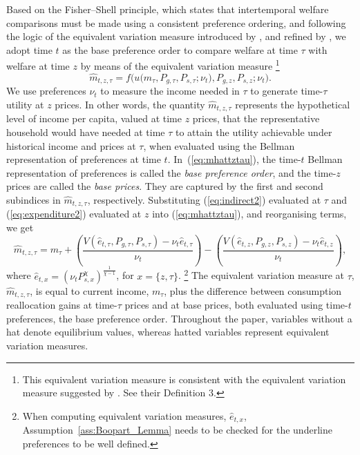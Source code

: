 \documentclass[12pt,a4paper]{article}
\begin{document}
Based on the Fisher–Shell principle, which states that intertemporal welfare comparisons must be made using a consistent preference ordering, and following the logic of the equivalent variation measure introduced by \cite{Licandro_RuizCastillo_Duran}, and refined by \cite{duran_licandro_2024}, we adopt time $t$ as the base preference order to compare welfare at time $\tau$ with welfare at time $z$ by means of the equivalent variation measure%
\footnote{This equivalent variation measure is consistent with the equivalent variation measure suggested by \cite{BB2023welfare}. See their Definition 3.}
\begin{equation}\label{eq:mhattztau}
\widehat{m}_{t,z,\tau} = f\Big( u\big(m_{\tau}, P_{g,\tau}, P_{s,\tau}; \nu_t \big), P_{g,z}, P_{s,z}; \nu_t \Big).
\end{equation}
We use preferences $\nu_t$ to measure the income needed in $\tau$ to generate time-$\tau$ utility at $z$ prices.
In other words, the quantity \( \widehat{m}_{t,z,\tau} \) represents the hypothetical level of income per capita, valued at time $z$ prices, that the representative household would have needed at time \( \tau \) to attain the utility achievable under historical income and prices at \( \tau \), when evaluated using the Bellman representation of preferences at time \( t \). 
In~(\ref{eq:mhattztau}), the time-$t$ Bellman representation of preferences is called the {\it base preference order}, and the time-$z$ prices are called the {\it base prices}.
They are captured by the first and second subindices in \(\widehat{m}_{t,z,\tau}\), respectively.
Substituting (\ref{eq:indirect2}) evaluated at $\tau$ and (\ref{eq:expenditure2}) evaluated at $z$ into (\ref{eq:mhattztau}), and reorganising terms, we get 
\begin{equation}\label{eq:mhattztau2}
\widehat{m}_{t,z,\tau} 
= m_{\tau}  + \left( \frac{V(\widehat{e}_{t,\tau} , P_{g,\tau}, P_{s,\tau}) - \nu_t \widehat{e}_{t,\tau} }{\nu_t} \right)
- \left( \frac{V(\widehat{e}_{t,z} , P_{g,z}, P_{s,z}) - \nu_t \widehat{e}_{t,z}}{\nu_t}  \right) ,
\end{equation}
where $ \widehat e_{t,x} = \left( \nu_t P_{s,x}^\chi \right)^{\frac{1}{\chi - 1}}$, for $x=\{z,\tau\}$.%
\footnote{When computing equivalent variation measures, $\widehat e_{t,x}$, Assumption~\ref{ass:Boopart_Lemma} needs to be checked for the underline preferences to be well defined.}
The equivalent variation measure at $\tau$, $\widehat{m}_{t,z,\tau}$, is equal to current income, $m_\tau$,  
plus the difference between consumption reallocation gains at time-$\tau$ prices and at base prices,  both evaluated using time-$t$ preferences, the base preference order.
Throughout the paper, variables without a hat denote equilibrium values, whereas hatted variables represent equivalent variation measures.
\end{document}
